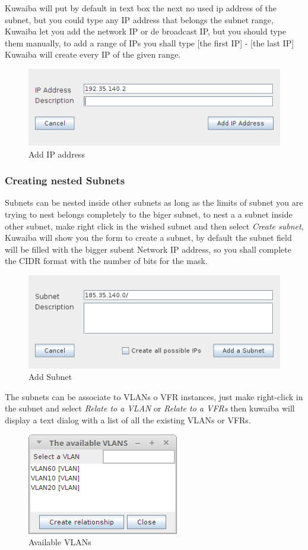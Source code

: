 \documentclass[a4paper]{article}
\begin{document}
		Kuwaiba will put by default in text box the next no used ip address of the subnet, but you could type any IP address that belongs the subnet range, Kuwaiba let you add the network IP or de broadcast IP, but you should type them manually, to add a range of IPs you shall type [the first IP] - [the last IP] Kuwaiba will create every IP of the given range. 
		\begin{figure}[h!]
			\centering
			\includegraphics[width=0.5\linewidth]{img/ipam_add_ip_address.png}
			\caption{Add IP address}
			\label{fig:ipam_add_ip_address}
		\end{figure}
	
	   	\subsubsection{Creating nested Subnets}
	   	
		Subnets can be nested inside other subnets as long as the limits of subnet you are trying to nest belongs  completely to the biger subnet, to nest a a subnet inside other subnet, make right click in the wished subnet and then select \textit{Create subnet}, Kuwaiba will show you the form to create a subnet, by default the subnet field will be filled with the bigger subent Network IP address, so you shall complete the CIDR format with the number of bits for the mask.
		\begin{figure}[h!]
			\centering
			\includegraphics[width=0.5\linewidth]{img/ipam_add_subsubnet.png}
			\caption{Add Subnet}
			\label{fig:ipam_add_subsubnet}
		\end{figure}
		
		
		The subnets can be associate to VLANs o VFR instances, just make right-click in the subnet and select \textit{Relate to a VLAN} or \textit{Relate to a VFRs} then kuwaiba will display a text dialog with a list of all the existing VLANs or VFRs.
		\begin{figure}[h!]
			\centering
			\includegraphics[width=0.3\linewidth]{img/ipam_available_vlans.png}
			\caption{Available VLANs}
			\label{fig:ipam_available_vlans}
		\end{figure}
		
\end{document}

